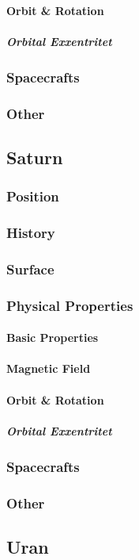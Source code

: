 \paragraph{Orbit \& Rotation}
\subparagraph{Orbital Exxentritet}
\subsubsection{Spacecrafts}
\subsubsection{Other}
\subsection{Saturn}
\subsubsection{Position}
\subsubsection{History}
\subsubsection{Surface}
\subsubsection{Physical Properties}
\paragraph{Basic Properties}
\paragraph{Magnetic Field}
\paragraph{Orbit \& Rotation}
\subparagraph{Orbital Exxentritet}
\subsubsection{Spacecrafts}
\subsubsection{Other}
\subsection{Uran}
